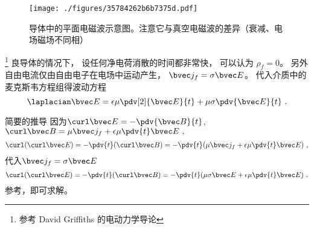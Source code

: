 
\begin{figure}[ht]
\centering
\texttt{[image: ./figures/35784262b6b7375d.pdf]}
\caption{导体中的平面电磁波示意图。注意它与真空电磁波的差异（衰减、电场磁场不同相）} \label{fig_MetalW_1}
\end{figure}

\footnote{参考 David Griffiths 的电动力学导论} 良导体的情况下， 设任何净电荷消散的时间都非常快， 可以认为 $\rho_f = 0$。 另外自由电流仅由自由电子在电场中运动产生， $\bvec j_f = \sigma \bvec E$。 代入介质中的麦克斯韦方程组得波动方程
\begin{equation}
\laplacian \bvec E = \epsilon \mu \pdv[2]{\bvec E}{t} + \mu\sigma \pdv{\bvec E}{t}~.
\end{equation}

\begin{example}{简要的推导}
因为$\curl\bvec E = -\pdv{\bvec B}{t}$, $\curl\bvec B = \mu \bvec j_f + \epsilon\mu \pdv{t} \bvec E~,$
\begin{equation}
\curl(\curl\bvec E) = -\pdv{t} (\curl\bvec B) =-\pdv{t}(\mu \bvec j_f + \epsilon\mu \pdv{t} \bvec E)~,
\end{equation}
代入$\bvec j_f = \sigma \bvec E$
\begin{equation}
\curl(\curl\bvec E) = -\pdv{t} (\curl\bvec B) =-\pdv{t}(\mu \sigma \bvec E + \epsilon\mu \pdv{t} \bvec E)~.
\end{equation}
参考，即可求解。
\end{example}


